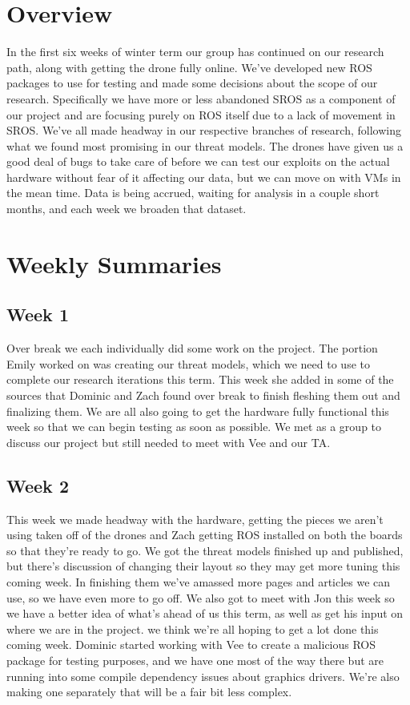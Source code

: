\documentclass[IEEEtran,letterpaper,10pt,notitlepage,draftclsnofoot,onecolumn]{article}
\begin{document}
\newpage
{}
\tableofcontents
\clearpage

\section{Overview}
In the first six weeks of winter term our group has continued on our research path, along with getting the drone fully online. 
We've developed new ROS packages to use for testing and made some decisions about the scope of our research. 
Specifically we have more or less abandoned SROS as a component of our project and are focusing purely on ROS itself due to a lack of movement in SROS.
We've all made headway in our respective branches of research, following what we found most promising in our threat models.
The drones have given us a good deal of bugs to take care of before we can test our exploits on the actual hardware without fear of it affecting our data, but we can move on with VMs in the mean time.
Data is being accrued, waiting for analysis in a couple short months, and each week we broaden that dataset.

\section{Weekly Summaries}
\subsection{Week 1}
Over break we each individually did some work on the project. 
The portion Emily worked on was creating our threat models, which we need to use to complete our research iterations this term. 
This week she added in some of the sources that Dominic and Zach found over break to finish fleshing them out and finalizing them. 
We are all also going to get the hardware fully functional this week so that we can begin testing as soon as possible. 
We met as a group to discuss our project but still needed to meet with Vee and our TA.

\subsection{Week 2}
This week we made headway with the hardware, getting the pieces we aren't using taken off of the drones and Zach getting ROS installed on both the boards so that they're ready to go. 
We got the threat models finished up and published, but there's discussion of changing their layout so they may get more tuning this coming week. 
In finishing them we've amassed more pages and articles we can use, so we have even more to go off. 
We also got to meet with Jon this week so we have a better idea of what's ahead of us this term, as well as get his input on where we are in the project. 
we think we're all hoping to get a lot done this coming week.
Dominic started working with Vee to create a malicious ROS package for testing purposes, and we have one most of the way there but are running into some compile dependency issues about graphics drivers. 
We're also making one separately that will be a fair bit less complex.
\end{document}
